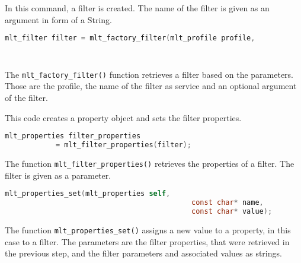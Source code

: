 \documentclass[../MasterThesis.tex]{subfiles}
\begin{document}
\begin{description}[font=\normalfont\color{RedViolet!80!black}, style=nextline]
	
	
	\item[Create a filter] 
	
	In this command, a filter is created. The name of the filter is given as an argument in form of a String.
	
	\begin{lstlisting}[language=C, numbers=none, basicstyle=\footnotesize\ttfamily, belowskip=0pt, aboveskip=9pt]
	mlt_filter filter = mlt_factory_filter(mlt_profile profile, 
																					const char* service, 
																					const void* input); \end{lstlisting}
														
	The \texttt{mlt\_factory\_filter()} function retrieves a filter based on the parameters. Those are the profile, the name of the filter as service and an optional argument of the filter.



	\item[Create and set filter properties] 

	This code creates a property object and sets the filter properties.

	\begin{lstlisting}[language=C, numbers=none, basicstyle=\footnotesize\ttfamily, belowskip=0pt, aboveskip=9pt]
	mlt_properties filter_properties 
			= mlt_filter_properties(filter); \end{lstlisting}

	The function \texttt{mlt\_filter\_properties()} retrieves the properties of a filter. The filter is given as a parameter.

	\begin{lstlisting}[language=C, numbers=none, basicstyle=\footnotesize\ttfamily, belowskip=0pt, aboveskip=9pt]
	mlt_properties_set(mlt_properties self,
											const char* name,
											const char* value); \end{lstlisting}

	The function \texttt{mlt\_properties\_set()} assigns a new value to a property, in this case to a filter. The parameters are the filter properties, that were retrieved in the previous step, and the filter parameters and associated values as strings.
	
	
	
	
	\item[Connect elements] 
	

\end{description}
\end{document}
